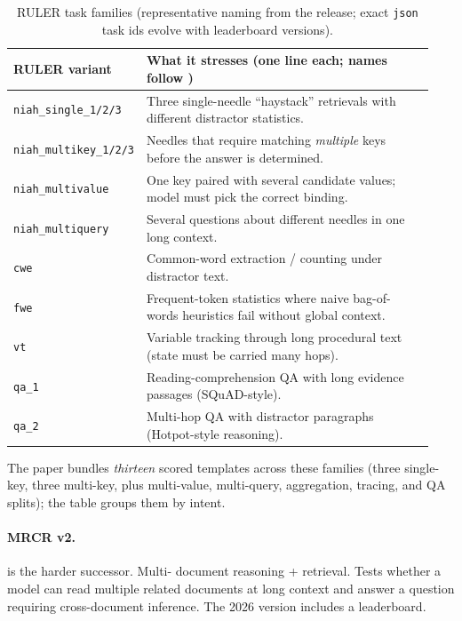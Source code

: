 \begin{table}[htbp]
\noindent
\scriptsize
\begin{tabular}{@{}p{0.22\linewidth}p{0.72\linewidth}@{}}
\toprule
RULER variant & What it stresses (one line each; names follow \citet{hsieh2024ruler}) \\
\midrule
\texttt{niah\_single\_1/2/3} & Three single-needle ``haystack'' retrievals with different distractor statistics. \\
\texttt{niah\_multikey\_1/2/3} & Needles that require matching \emph{multiple} keys before the answer is determined. \\
\texttt{niah\_multivalue} & One key paired with several candidate values; model must pick the correct binding. \\
\texttt{niah\_multiquery} & Several questions about different needles in one long context. \\
\texttt{cwe} & Common-word extraction / counting under distractor text. \\
\texttt{fwe} & Frequent-token statistics where naive bag-of-words heuristics fail without global context. \\
\texttt{vt} & Variable tracking through long procedural text (state must be carried many hops). \\
\texttt{qa\_1} & Reading-comprehension QA with long evidence passages (SQuAD-style). \\
\texttt{qa\_2} & Multi-hop QA with distractor paragraphs (Hotpot-style reasoning). \\
\bottomrule
\end{tabular}
\caption{RULER task families (representative naming from the release; exact
\texttt{json} task ids evolve with leaderboard versions).}
\label{tab:ruler-subtasks}
\end{table}

\noindent
The paper bundles \emph{thirteen} scored templates across these families
(three single-key, three multi-key, plus multi-value, multi-query,
aggregation, tracing, and QA splits); the table groups them by intent.

\paragraph{MRCR v2.} \citet{chen2025mrcr} is the harder successor. Multi-
document reasoning + retrieval. Tests whether a model can read multiple
related documents at long context and answer a question requiring
cross-document inference. The 2026 version includes a leaderboard.

